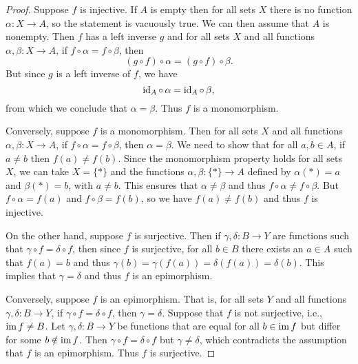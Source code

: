\begin{proof}
    Suppose \(f\) is injective. If \(A\) is empty then for all sets \(X\) there
    is no function \(\alpha: X \to A\), so the statement is vacuously true. We
    can then assume that \(A\) is nonempty. Then \(f\) has a left inverse \(g\)
    and for all sets \(X\) and all functions \(\alpha, \beta: X \to A\), if \(f
    \circ \alpha = f \circ \beta\), then 
    \[
        (g \circ f)\circ \alpha = (g \circ f) \circ \beta.
    \]
    But since \(g\) is a left inverse of \(f\), we have
    \[
        \operatorname{id}_A \circ\,\alpha = \operatorname{id}_A \circ\,\beta,
    \]
    from which we conclude that \(\alpha = \beta\). Thus \(f\) is a
    monomorphism. 
    
    Conversely, suppose \(f\) is a monomorphism. Then for all sets \(X\) and all
    functions \(\alpha, \beta: X \to A\), if \(f \circ \alpha = f \circ \beta\),
    then \(\alpha = \beta\). We need to show that for all \(a, b \in A\), if \(a
    \neq b\) then \(f(a) \neq f(b)\). Since the monomorphism property holds for
    all sets \(X\), we can take \(X = \{*\}\) and the functions \(\alpha, \beta:
    \{*\} \to A\) defined by \(\alpha(*) = a\) and \(\beta(*) = b\), with \(a
    \neq b\). This ensures that \(\alpha \neq \beta\) and thus \(f \circ \alpha
    \neq f \circ \beta\). But \(f \circ \alpha = f(a)\) and \(f \circ \beta =
    f(b)\), so we have \(f(a) \neq f(b)\) and thus \(f\) is injective.

    On the other hand, suppose \(f\) is surjective. Then if \(\gamma, \delta: B
    \to Y\) are functions such that \(\gamma \circ f = \delta \circ f\), then
    since \(f\) is surjective, for all \(b \in B\) there exists an \(a \in A\)
    such that \(f(a) = b\) and thus \(\gamma(b) = \gamma(f(a)) = \delta(f(a)) =
    \delta(b)\). This implies that \(\gamma = \delta\) and thus \(f\) is an
    epimorphism.

    Conversely, suppose \(f\) is an epimorphism. That is, for all sets \(Y\) and
    all functions \(\gamma, \delta: B \to Y\), if \(\gamma \circ f = \delta
    \circ f\), then \(\gamma = \delta\). Suppose that \(f\) is not surjective,
    i.e., \(\operatorname{im} f \neq B\). Let \(\gamma, \delta: B \to Y\) be functions that
    are equal for all \(b \in \operatorname{im} f\) but differ for some \(b \notin \operatorname{im} f\).
    Then \(\gamma \circ f = \delta \circ f\) but \(\gamma \neq \delta\), which
    contradicts the assumption that \(f\) is an epimorphism. Thus \(f\) is
    surjective.
\end{proof}

